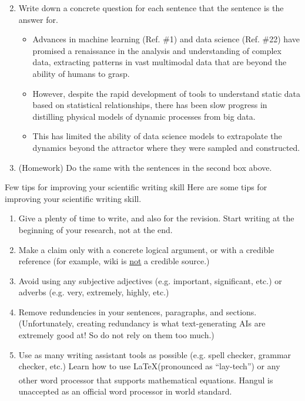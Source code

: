\documentclass{beamer}
\begin{document}
\begin{frame}
\begin{enumerate}
    \setcounter{enumi}{1}
    \item Write down a concrete question for each sentence that the sentence is the answer for.
    \begin{itemize}
        \item Advances in machine learning (Ref. \#1) and data science (Ref. \#22) have promised a renaissance in the analysis and understanding of complex data, extracting patterns in vast multimodal data that are beyond the ability of humans to grasp. 
        \item However, despite the rapid development of tools to understand static data based on statistical relationships, there has been slow progress in distilling physical models of dynamic processes from big data. 
        \item This has limited the ability of data science models to extrapolate the dynamics beyond the attractor where they were sampled and constructed. 
    \end{itemize}
    \item (Homework) Do the same with the sentences in the second box above.
\end{enumerate}
\end{frame}


\begin{frame}{Few tips for improving your scientific writing skill}
Here are some tips for improving your scientific writing skill.
\begin{enumerate}
    \item Give a plenty of time to write, and also for the revision. Start writing at the beginning of your research, not at the end.
    \item Make a claim only with a concrete logical argument, or with a credible reference (for example, wiki is \underline{not} a credible source.)
    \item Avoid using any subjective adjectives (e.g. important, significant, etc.) or adverbs (e.g. very, extremely, highly, etc.)
    \item Remove redundencies in your sentences, paragraphs, and sections. (Unfortunately, creating redundancy is what text-generating AIs are extremely good at! So do not rely on them too much.)
    \item Use as many writing assistant tools as possible (e.g. spell checker, grammar checker, etc.) Learn how to use \LaTeX (pronounced as ``lay-tech'') or any other word processor that supports mathematical equations. Hangul\textsuperscript{\textregistered} is unaccepted as an official word processor in world standard.
\end{enumerate}
\end{frame}
\end{document}
